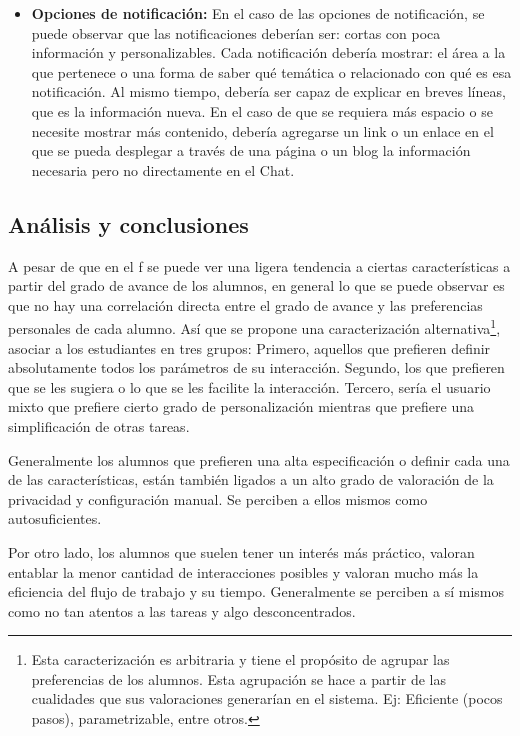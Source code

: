 \begin{itemize}
        \item \textbf{Opciones de notificación:} En el caso de las opciones de notificación, se puede observar que las notificaciones deberían ser: cortas con poca información y personalizables. Cada notificación debería mostrar: el área a la que pertenece o una forma de saber qué temática o relacionado con qué es esa notificación. Al mismo tiempo, debería ser capaz de explicar en breves líneas, que es la información nueva. En el caso de que se requiera más espacio o se necesite mostrar más contenido, debería agregarse un link o un enlace en el que se pueda desplegar a través de una página o un blog la información necesaria pero no directamente en el Chat.
        
    \end{itemize}

    \subsection{Análisis y conclusiones}
    \par A pesar de que en el \acrlong{f} se puede ver una ligera tendencia a ciertas características a partir del grado de avance de los alumnos, en general lo que se puede observar es que no hay una correlación directa entre el grado de avance y las preferencias personales de cada alumno. Así que se propone una caracterización alternativa\footnote{Esta caracterización es arbitraria y tiene el propósito de agrupar las preferencias de los alumnos. Esta agrupación se hace a partir de las cualidades que sus valoraciones generarían en el sistema. Ej: Eficiente (pocos pasos), parametrizable, entre otros.}, asociar a los estudiantes en tres grupos: Primero, aquellos que prefieren definir absolutamente todos los parámetros de su interacción. Segundo, los que prefieren que se les sugiera o lo que se les facilite la interacción. Tercero, sería el usuario mixto que prefiere cierto grado de personalización mientras que prefiere una simplificación de otras tareas.
    \par Generalmente los alumnos que prefieren una alta especificación o definir cada una de las características, están también ligados a un alto grado de valoración de la privacidad y configuración manual. Se perciben a ellos mismos como autosuficientes.
    \par Por otro lado, los alumnos que suelen tener un interés más práctico, valoran entablar la menor cantidad de interacciones posibles y valoran mucho más la eficiencia del flujo de trabajo y su tiempo. Generalmente se perciben a sí mismos como no tan atentos a las tareas y algo desconcentrados.
